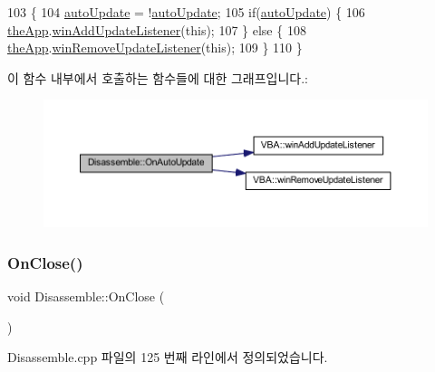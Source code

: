\begin{DoxyCode}
103 \{
104   \mbox{\hyperlink{class_disassemble_a347234b8c8fa03c0bc21e39c03efc36d}{autoUpdate}} = !\mbox{\hyperlink{class_disassemble_a347234b8c8fa03c0bc21e39c03efc36d}{autoUpdate}};
105   \textcolor{keywordflow}{if}(\mbox{\hyperlink{class_disassemble_a347234b8c8fa03c0bc21e39c03efc36d}{autoUpdate}}) \{
106     \mbox{\hyperlink{_v_b_a_8cpp_a8095a9d06b37a7efe3723f3218ad8fb3}{theApp}}.\mbox{\hyperlink{class_v_b_a_af0712f70a90d023ab8327a366be08174}{winAddUpdateListener}}(\textcolor{keyword}{this});
107   \} \textcolor{keywordflow}{else} \{
108     \mbox{\hyperlink{_v_b_a_8cpp_a8095a9d06b37a7efe3723f3218ad8fb3}{theApp}}.\mbox{\hyperlink{class_v_b_a_a2d31a0656df2230310aa8dc9e3a735d3}{winRemoveUpdateListener}}(\textcolor{keyword}{this});    
109   \}  
110 \}
\end{DoxyCode}
이 함수 내부에서 호출하는 함수들에 대한 그래프입니다.\+:
\nopagebreak
\begin{figure}[H]
\begin{center}
\leavevmode
\includegraphics[width=350pt]{class_disassemble_a5423cb1c85c1e4bb05b3d4018c804826_cgraph}
\end{center}
\end{figure}
\mbox{\label{class_disassemble_a8f239c5117018f44ee0847b530a9eee1}} 
\subsubsection{\texorpdfstring{On\+Close()}{OnClose()}}
{\footnotesize\ttfamily void Disassemble\+::\+On\+Close (\begin{DoxyParamCaption}{ }\end{DoxyParamCaption})\hspace{0.3cm}{\ttfamily [protected]}}



Disassemble.\+cpp 파일의 125 번째 라인에서 정의되었습니다.


